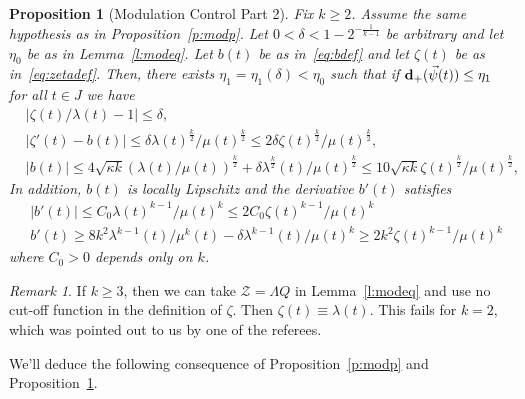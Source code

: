 \documentclass[10pt,reqno]{amsart}
\def\cZ {\mathcal{Z}}
\newcommand{\uln}[1]{{\underline{ #1 }}}
\newcommand{\Blue}[1]{{\color{blue} #1}}
\newcommand{\de}{\delta}
\newcommand{\la}{\lambda}
\newcommand{\abs}[1]{\left\lvert{#1}\right\rvert}
\numberwithin{equation}{section}
\newtheorem{prop}[thm]{Proposition}
\theoremstyle{remark}
\newtheorem{rem}[thm]{Remark}
\newcommand{\0}{\emptyset}
\newcommand{\bfd}{{\bf d}}
\begin{document}
\begin{prop}[Modulation Control Part 2] \label{p:modp2} Fix $k \ge 2$. 
Assume the same hypothesis as in  Proposition~\ref{p:modp}. Let $0<\de< 1- 2^{-\frac{1}{k-1}}$ be arbitrary and let $\eta_0$ be as in Lemma~\ref{l:modeq}.  Let $b(t)$ be as in~\eqref{eq:bdef} and let $\zeta(t)$ be as in~\eqref{eq:zetadef}. %
Then, there exists $\eta_1 = \eta_1(\de) < \eta_0$ such that  if $\bfd_+(\vec \psi(t)) \le \eta_1$ for all $t \in J$ we have 
\begin{align}
&\abs{\zeta(t)/\lambda(t) - 1} \le \de , \label{eq:bound-on-l} \\ 
& \abs{\zeta'(t) - b(t) } \le \de \la(t)^{\frac k2}/\mu(t)^{\frac k2}  \le 2 \de \zeta(t)^{\frac k2}/\mu(t)^{\frac k2},  \label{eq:kala'}  \\ 
&\abs{b(t)} \le 4\sqrt{\kappa k }  (\la(t)/\mu(t))^{\frac{k}{2}} + \de \la^{\frac{k}{2}}(t)/\mu(t)^\frac k2  \le 10 \sqrt{\kappa k } \zeta(t)^{\frac k2}/\mu(t)^{\frac k2},\label{eq:b-bound}  \
\end{align}
In addition, $b(t)$ is locally Lipschitz and the derivative $b'(t)$ satisfies
\begin{align}
&|b'(t)| \leq C_0 \lambda(t)^{k-1}/\mu(t)^k \leq 2C_0 \zeta(t)^{k-1}/ \mu(t)^k \label{eq:b'} \\
&b'(t) \ge 8k^2 \la^{k-1}(t)/\mu^k(t) - \de \la^{k-1}(t)/\mu(t)^k \ge 2k^2 \zeta(t)^{k-1}/ \mu(t)^k \label{eq:b'lb}  
\end{align} 
where $C_0 > 0$ depends only on $k$. 
\end{prop} 

\begin{rem}
If $k \geq 3$, then we can take $\cZ = \Lambda Q$ in Lemma~\ref{l:modeq} and use no cut-off function in the definition of $\zeta$. 
Then $\zeta(t) \equiv \lambda(t)$.
This fails for $k = 2$, which was pointed out to us by one of the referees.
\end{rem}


We'll deduce the following consequence of Proposition~\ref{p:modp} and Proposition~\ref{p:modp2}. 
\end{document}
